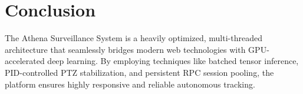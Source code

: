 \documentclass{article}
\begin{document}
\section{Conclusion}
The Athena Surveillance System is a heavily optimized, multi-threaded architecture that seamlessly bridges modern web technologies with GPU-accelerated deep learning. By employing techniques like batched tensor inference, PID-controlled PTZ stabilization, and persistent RPC session pooling, the platform ensures highly responsive and reliable autonomous tracking.
\end{document}
